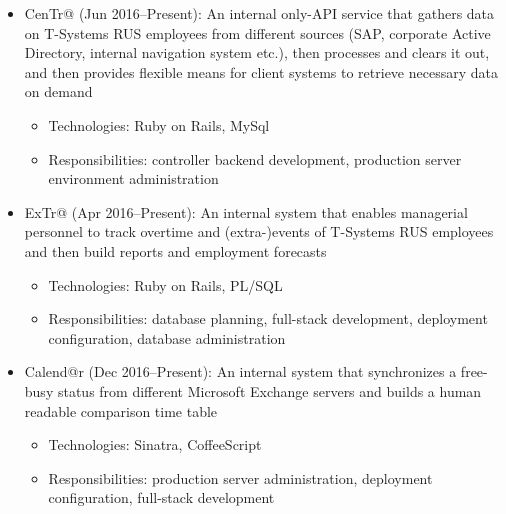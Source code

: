 \documentclass{scrartcl}
\begin{document}
\begin{cv}{}
{\begin{itemize}
    \item CenTr@ (Jun 2016--Present): An internal only-API service that
    gathers data on T-Systems RUS employees from different sources (SAP,
    corporate Active Directory, internal navigation system etc.), then
    processes and clears it out, and then provides flexible means for client
    systems to retrieve necessary data on demand
        \begin{itemize}
            \item Technologies: Ruby on Rails, MySql
            \item Responsibilities: controller backend development, production
                server environment administration
        \end{itemize}

    \item ExTr@ (Apr 2016--Present): An internal system that enables managerial
    personnel to track overtime and (extra-)events of T-Systems RUS
    employees and then build reports and employment forecasts
        \begin{itemize}
            \item Technologies: Ruby on Rails, PL/SQL
            \item Responsibilities: database planning, full-stack development,
                deployment configuration, database administration
        \end{itemize}

    \item Calend@r (Dec 2016--Present): An internal system that synchronizes a
    free-busy status from different Microsoft Exchange servers and builds a
    human readable comparison time table
        \begin{itemize}
            \item Technologies: Sinatra, CoffeeScript
            \item Responsibilities: production server administration,
                deployment configuration, full-stack development
        \end{itemize}

    \end{itemize}
}




\end{cv}
\end{document}
